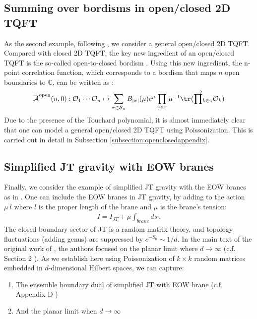 \documentclass[a4paper,11pt]{article}
\theoremstyle{definition}
\numberwithin{equation}{section}
\begin{document}
\subsection{Summing over bordisms in open/closed 2D TQFT}\label{subsection:openclosed}

As the second example, following \cite{gardiner20212D,banerjee2022comments}, we consider a general open/closed 2D TQFT. Compared with closed 2D TQFT, the key new ingredient of an open/closed TQFT is the so-called open-to-closed bordism \cite{banerjee2022comments, Lauda-Pfeiffer}. Using this new ingredient, the n-point correlation function, which corresponds to a bordism that maps $n$ open boundaries to $\mathbb{C}$, can be written as \cite{banerjee2022comments}:
\begin{equation}
    \overline{\mathcal{A}}^\text{open}(n,0):\mathcal{O}_1\cdots\mathcal{O}_n\mapsto\sum_{\pi\in\mathcal{S}_n}B_{|\pi|}(\mu)e^\mu\prod_{\gamma\in\pi}\mu^{-1}\tr(\overrightarrow{\prod}_{k\in\gamma}\mathcal{O}_k)
\end{equation}
Due to the presence of the Touchard polynomial, it is almost immediately clear that one can model a general open/closed 2D TQFT using Poissonization. This is carried out in detail in Subsection \ref{subsection:openclosedappendix}. 
\subsection{Simplified JT gravity with EOW branes}\label{subsec:JTEOW}

Finally, we consider the example of simplified JT gravity with the EOW branes as in \cite{Penington:2019kki}. 
One can include the EOW branes in JT gravity, by adding to the action $\mu\: l$ where $l$ is the proper length of the brane and $\mu$ is the brane's tension:
\begin{eqnarray}
    I=I_{JT}+\mu \int_{brane} ds\ .
\end{eqnarray}
The closed boundary sector of JT is a random matrix theory, and topology fluctuations (adding genus) are suppressed by $e^{-S_0}\sim 1/d$. In the main text of the original work of \cite{Penington:2019kki}, the authors focused on the planar limit where $d\rightarrow\infty$ (c.f. Section 2 \cite{Penington:2019kki}). As we establish here using Poissonization of $k\times k$ random matrices embedded in $d$-dimensional Hilbert spaces, we can capture:
\begin{enumerate}
    \item The ensemble boundary dual of simplified JT with EOW brane (c.f. Appendix D \cite{Penington:2019kki})
    \item And the planar limit when $d\rightarrow\infty$
\end{enumerate}
\end{document}
